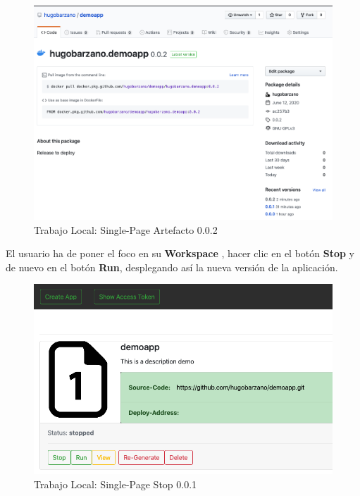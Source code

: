 \documentclass[a4paper,11pt]{book}
\begin{document}
   \begin{figure}[H]
\centering
\includegraphics[scale=0.3]{imagenes/casouso_a/3_8.png}
\caption{ Trabajo Local: Single-Page Artefacto 0.0.2  }
\label{3_8}
\end{figure}


 El usuario ha de poner el foco en su \textbf{Workspace} , hacer clic en el botón \textbf{Stop} y de nuevo en el botón \textbf{Run}, desplegando así la nueva versión de la aplicación. 
 
\begin{figure}[H]
\centering
\includegraphics[scale=0.4]{imagenes/casouso_a/3_9.png}
\caption{ Trabajo Local: Single-Page Stop 0.0.1}
\label{3_9}
\end{figure}
 
\end{document}
